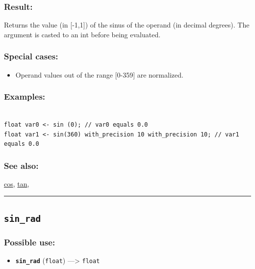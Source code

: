 \documentclass[]{book}
\providecommand{\tightlist}{%
  \setlength{\itemsep}{0pt}\setlength{\parskip}{0pt}}
\theoremstyle{definition}
\theoremstyle{definition}
\theoremstyle{definition}
\theoremstyle{remark}
\begin{document}
\subsubsection{Result:}\label{result-460}

Returns the value (in {[}-1,1{]}) of the sinus of the operand (in
decimal degrees). The argument is casted to an int before being
evaluated.

\subsubsection{Special cases:}\label{special-cases-122}

\begin{itemize}
\tightlist
\item
  Operand values out of the range {[}0-359{]} are normalized.
\end{itemize}

\subsubsection{Examples:}\label{examples-332}

\begin{verbatim}
 
float var0 <- sin (0); // var0 equals 0.0 
float var1 <- sin(360) with_precision 10 with_precision 10; // var1 equals 0.0
\end{verbatim}

\subsubsection{See also:}\label{see-also-185}

\href{operators-b-to-c.html\#cos}{cos},
\href{operators-s-to-z.html\#tan}{tan},

\begin{center}\rule{0.5\linewidth}{\linethickness}\end{center}

\subsection{\texorpdfstring{\texttt{sin\_rad}}{sin\_rad}}\label{sin_rad}

\subsubsection{Possible use:}\label{possible-use-477}

\begin{itemize}
\tightlist
\item
  \textbf{\texttt{sin\_rad}} (\texttt{float}) ---\textgreater{}
  \texttt{float}
\end{itemize}
\end{document}
